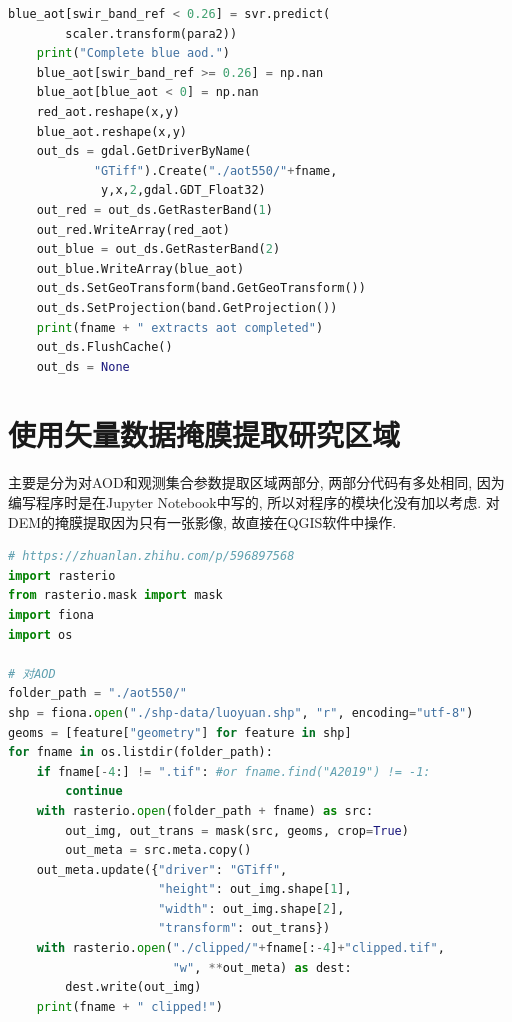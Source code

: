 \documentclass{ctexart}
\begin{document}
\begin{sloppypar}
\begin{appendices}
\begin{lstlisting}[frame=single, language=Python, basicstyle={\ttfamily}, label=fit, caption={计算AOD}]
    blue_aot[swir_band_ref < 0.26] = svr.predict(
        scaler.transform(para2))
    print("Complete blue aod.")
    blue_aot[swir_band_ref >= 0.26] = np.nan
    blue_aot[blue_aot < 0] = np.nan
    red_aot.reshape(x,y)
    blue_aot.reshape(x,y)
    out_ds = gdal.GetDriverByName(
    		"GTiff").Create("./aot550/"+fname, 
             y,x,2,gdal.GDT_Float32)
    out_red = out_ds.GetRasterBand(1)
    out_red.WriteArray(red_aot)
    out_blue = out_ds.GetRasterBand(2)
    out_blue.WriteArray(blue_aot)
    out_ds.SetGeoTransform(band.GetGeoTransform())
    out_ds.SetProjection(band.GetProjection())
    print(fname + " extracts aot completed")
    out_ds.FlushCache()
    out_ds = None
\end{lstlisting}
\section{使用矢量数据掩膜提取研究区域}
主要是分为对AOD和观测集合参数提取区域两部分, 
两部分代码有多处相同, 因为编写程序时是在Jupyter Notebook中写的, 所以对程序的模块化没有加以考虑. 
对DEM的掩膜提取因为只有一张影像, 故直接在QGIS软件中操作. 
\begin{lstlisting}[frame=single, language=Python, basicstyle={\ttfamily}, label=mask, caption={对研究区域掩膜提取}]
# https://zhuanlan.zhihu.com/p/596897568
import rasterio
from rasterio.mask import mask
import fiona
import os

# 对AOD
folder_path = "./aot550/"
shp = fiona.open("./shp-data/luoyuan.shp", "r", encoding="utf-8")
geoms = [feature["geometry"] for feature in shp]
for fname in os.listdir(folder_path):
    if fname[-4:] != ".tif": #or fname.find("A2019") != -1:
        continue
    with rasterio.open(folder_path + fname) as src:
        out_img, out_trans = mask(src, geoms, crop=True)
        out_meta = src.meta.copy()
    out_meta.update({"driver": "GTiff",
                     "height": out_img.shape[1],
                     "width": out_img.shape[2],
                     "transform": out_trans})
    with rasterio.open("./clipped/"+fname[:-4]+"clipped.tif", 
                       "w", **out_meta) as dest:
        dest.write(out_img)
    print(fname + " clipped!")


\end{lstlisting}
\end{appendices}
\end{sloppypar}
\end{document}
